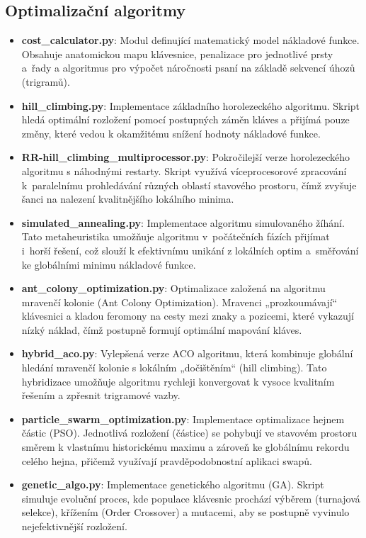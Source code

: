 \documentclass[a4paper, twoside, 12pt, czech]{article}
\begin{document}
\subsection*{Optimalizační algoritmy}
\begin{itemize}
    \item \textbf{cost\_calculator.py}: Modul definující matematický model nákladové funkce. Obsahuje anatomickou mapu klávesnice, penalizace pro jednotlivé prsty a~řady a algoritmus pro výpočet náročnosti psaní na základě sekvencí úhozů (trigramů).
    \item \textbf{hill\_climbing.py}: Implementace základního horolezeckého algoritmu. Skript hledá optimální rozložení pomocí postupných záměn kláves a přijímá pouze změny, které vedou k okamžitému snížení hodnoty nákladové funkce.
    \item \textbf{RR-hill\_climbing\_multiprocessor.py}: Pokročilejší verze horolezeckého algoritmu s náhodnými restarty. Skript využívá víceprocesorové zpracování k~paralelnímu prohledávání různých oblastí stavového prostoru, čímž zvyšuje šanci na nalezení kvalitnějšího lokálního minima.
    \item \textbf{simulated\_annealing.py}: Implementace algoritmu simulovaného žíhání. Tato metaheuristika umožňuje algoritmu v~počátečních fázích přijímat i~horší řešení, což slouží k efektivnímu unikání z lokálních optim a~směřování ke globálními minimu nákladové funkce.
    \item \textbf{ant\_colony\_optimization.py}: Optimalizace založená na algoritmu mravenčí kolonie (Ant Colony Optimization). Mravenci „prozkoumávají“ klávesnici a kladou feromony na cesty mezi znaky a pozicemi, které vykazují nízký náklad, čímž postupně formují optimální mapování kláves.
    \item \textbf{hybrid\_aco.py}: Vylepšená verze ACO algoritmu, která kombinuje globální hledání mravenčí kolonie s lokálním „dočištěním“ (hill climbing). Tato hybridizace umožňuje algoritmu rychleji konvergovat k vysoce kvalitním řešením a zpřesnit trigramové vazby.
    \item \textbf{particle\_swarm\_optimization.py}: Implementace optimalizace hejnem částic (PSO). Jednotlivá rozložení (částice) se pohybují ve stavovém prostoru směrem k vlastnímu historickému maximu a zároveň ke globálnímu rekordu celého hejna, přičemž využívají pravděpodobnostní aplikaci swapů.
    \item \textbf{genetic\_algo.py}: Implementace genetického algoritmu (GA). Skript simuluje evoluční proces, kde populace klávesnic prochází výběrem (turnajová selekce), křížením (Order Crossover) a mutacemi, aby se postupně vyvinulo nejefektivnější rozložení.
\end{itemize}
\end{document}
